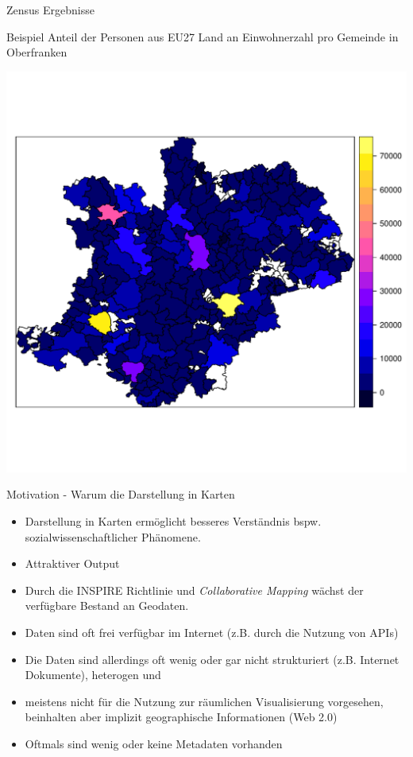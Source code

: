 \documentclass[ignorenonframetext,]{beamer}
\begin{document}
\begin{frame}{Zensus Ergebnisse}

Beispiel Anteil der Personen aus EU27 Land an Einwohnerzahl pro Gemeinde
in Oberfranken

\includegraphics{figure/KRSBamberg_EWZ.pdf}

\end{frame}

\begin{frame}{Motivation - Warum die Darstellung in Karten}

\begin{itemize}
\item
  Darstellung in Karten ermöglicht besseres Verständnis bspw.
  sozialwissenschaftlicher Phänomene.
\item
  Attraktiver Output
\item
  Durch die INSPIRE Richtlinie und \emph{Collaborative Mapping} wächst
  der verfügbare Bestand an Geodaten.
\item
  Daten sind oft frei verfügbar im Internet (z.B. durch die Nutzung von
  APIs)
\item
  Die Daten sind allerdings oft wenig oder gar nicht strukturiert (z.B.
  Internet Dokumente), heterogen und
\item
  meistens nicht für die Nutzung zur räumlichen Visualisierung
  vorgesehen, beinhalten aber implizit geographische Informationen (Web
  2.0)
\item
  Oftmals sind wenig oder keine Metadaten vorhanden
\end{itemize}

\end{frame}
\end{document}
